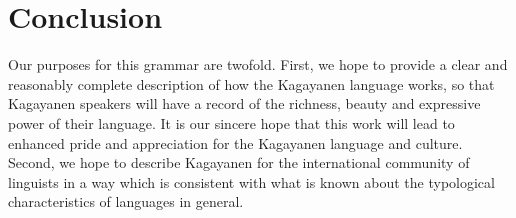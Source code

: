 \section{Conclusion}\label{sec:conclusion-1}
Our purposes for this grammar are twofold. First, we hope to provide a clear and reasonably complete description of how the Kagayanen language works, so that Kagayanen speakers will have a record of the richness, beauty and expressive power of their language. It is our sincere hope that this work will lead to enhanced pride and appreciation for the Kagayanen language and culture. Second, we hope to describe Kagayanen for the international community of linguists in a way which is consistent with what is known about the typological characteristics of languages in general.
